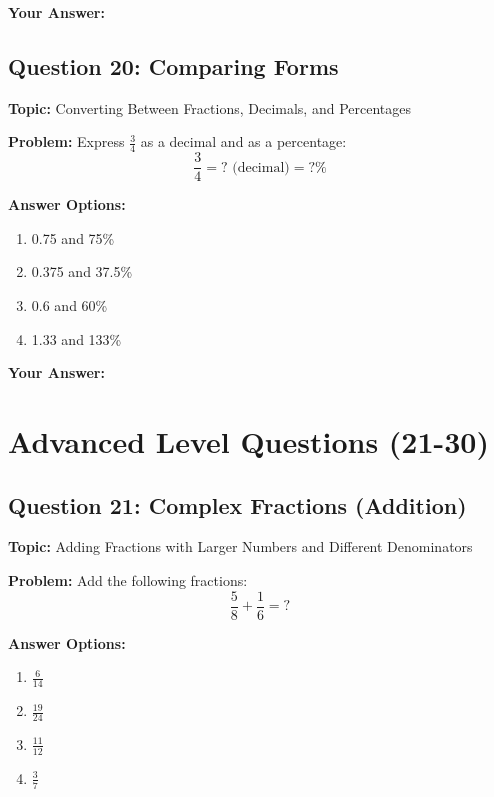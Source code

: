 \documentclass[12pt]{article}
\begin{document}
\noindent\textbf{Your Answer:} \underline{\hspace{2cm}}

\vspace{0.5cm}


\subsection{Question 20: Comparing Forms}
\textbf{Topic:} Converting Between Fractions, Decimals, and Percentages

\textbf{Problem:} Express $\frac{3}{4}$ as a decimal and as a percentage:
\[\frac{3}{4} = \text{?} \text{ (decimal)} = \text{?}\%\]

\textbf{Answer Options:}
\begin{enumerate}[label=\Alph*)]
    \item 0.75 and 75\%
    \item 0.375 and 37.5\%
    \item 0.6 and 60\%
    \item 1.33 and 133\%
\end{enumerate}

\noindent\textbf{Your Answer:} \underline{\hspace{2cm}}

\newpage

\section{Advanced Level Questions (21-30)}

\subsection{Question 21: Complex Fractions (Addition)}
\textbf{Topic:} Adding Fractions with Larger Numbers and Different Denominators

\textbf{Problem:} Add the following fractions:
\[\frac{5}{8} + \frac{1}{6} = ?\]

\textbf{Answer Options:}
\begin{enumerate}[label=\Alph*)]
    \item $\frac{6}{14}$
    \item $\frac{19}{24}$
    \item $\frac{11}{12}$
    \item $\frac{3}{7}$
\end{enumerate}
\end{document}
